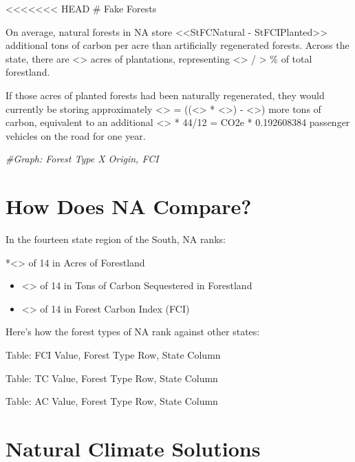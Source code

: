 \documentclass[
]{article}
\newenvironment{Shaded}{\begin{snugshade}}{\end{snugshade}}
\newcommand{\CommentTok}[1]{\textcolor[rgb]{0.56,0.35,0.01}{\textit{#1}}}
\begin{document}
\textless\textless\textless\textless\textless\textless\textless{} HEAD
\# Fake Forests

On average, natural forests in NA store \textless\textless StFCNatural -
StFCIPlanted\textgreater\textgreater{} additional tons of carbon per
acre than artificially regenerated forests. Across the state, there are
\textless{}\textgreater{} acres of plantations, representing
\textless{}\textgreater{} / \textgreater{} \% of total forestland.

If those acres of planted forests had been naturally regenerated, they
would currently be storing approximately \textless{}\textgreater{} =
((\textless{}\textgreater{} * \textless{}\textgreater) -
\textless{}\textgreater) more tons of carbon, equivalent to an
additional \textless{}\textgreater{} * 44/12 = CO2e * 0.192608384
passenger vehicles on the road for one year.

\begin{Shaded}
\begin{Highlighting}[]
\CommentTok{\#Graph: Forest Type X Origin, FCI}
\end{Highlighting}
\end{Shaded}

\hypertarget{how-does-na-compare}{%
\section{How Does NA Compare?}\label{how-does-na-compare}}

In the fourteen state region of the South, NA ranks:

*\textless{}\textgreater{} of 14 in Acres of Forestland

\begin{itemize}
\item
  \textless{}\textgreater{} of 14 in Tons of Carbon Sequestered in
  Forestland
\item
  \textless{}\textgreater{} of 14 in Forest Carbon Index (FCI)
\end{itemize}

Here's how the forest types of NA rank against other states:

Table: FCI Value, Forest Type Row, State Column

Table: TC Value, Forest Type Row, State Column

Table: AC Value, Forest Type Row, State Column

\hypertarget{natural-climate-solutions}{%
\section{Natural Climate Solutions}\label{natural-climate-solutions}}
\end{document}
